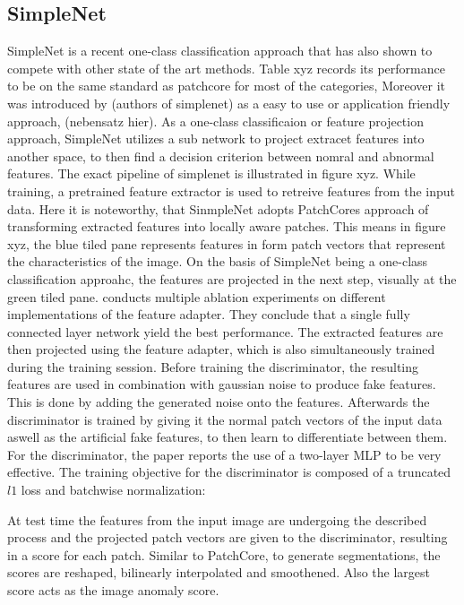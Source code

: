 \subsection{SimpleNet}
\label{subsec:simplenet}
SimpleNet \cite{liu2023simplenet} is a recent one-class classification approach that has also shown to compete with other state of the art methods. Table xyz records its performance to be on the same standard as patchcore 
for most of the categories, %
Moreover it was introduced by (authors of simplenet) as a easy to use or application friendly approach, (nebensatz hier).
As a one-class classificaion or feature projection approach, SimpleNet utilizes a sub network to project extracet features into another space, to then find a decision criterion between nomral and 
abnormal features. The exact pipeline of simplenet is illustrated in figure xyz. While training, a pretrained feature extractor is used to retreive features from the input data. Here it is noteworthy, 
that SinmpleNet adopts PatchCores approach of transforming extracted features into locally aware patches. This means in figure xyz, the blue tiled pane represents features in form patch vectors 
that represent the characteristics of the image. On the basis of SimpleNet being a one-class classification approahc, the features are projected in the next step, visually at the green tiled pane. 
\cite{liu2023simplenet} conducts multiple ablation experiments on different implementations of the feature adapter. They conclude that a single fully connected layer network yield the best 
performance. The extracted features are then projected using the feature adapter, which is also simultaneously trained during the training session. Before training the discriminator, the resulting 
features are used in combination with gaussian noise to produce fake features. This is done by adding the generated noise onto the features. Afterwards the discriminator is trained by giving it 
the normal patch vectors of the input data aswell as the artificial fake features, to then learn to differentiate between them. For the discriminator, the paper reports the use of a two-layer 
MLP to be very effective. The training objective for the discriminator is composed of a truncated $l1$ loss and batchwise normalization:


At test time the features from the input image are undergoing the described process and the projected patch vectors are given to the discriminator, resulting in a score for each patch. Similar to 
PatchCore, to generate segmentations, the scores are reshaped, bilinearly interpolated and smoothened. Also the largest score acts as the image anomaly score.

